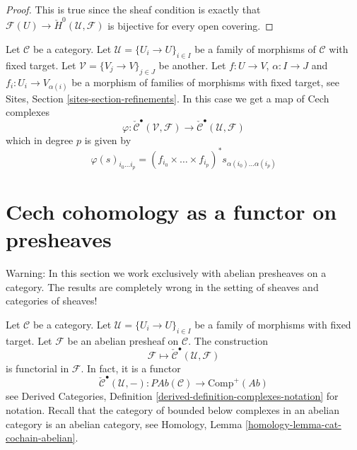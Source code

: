 \begin{proof}
This is true since the sheaf condition is exactly that
$\mathcal{F}(U) \to \check{H}^0(\mathcal{U}, \mathcal{F})$
is bijective for every open covering.
\end{proof}

\noindent
Let $\mathcal{C}$ be a category.
Let $\mathcal{U} = \{U_i \to U\}_{i\in I}$ be a family
of morphisms of $\mathcal{C}$ with fixed target.
Let $\mathcal{V} = \{V_j \to V\}_{j\in J}$ be another.
Let $f : U \to V$, $\alpha : I \to J$ and $f_i : U_i \to V_{\alpha(i)}$
be a morphism of families of morphisms with fixed target, see
Sites, Section \ref{sites-section-refinements}.
In this case we get a map of Cech complexes
\begin{equation}
\label{equation-map-cech-complexes}
\varphi : \check{\mathcal{C}}^\bullet(\mathcal{V}, \mathcal{F})
\longrightarrow
\check{\mathcal{C}}^\bullet(\mathcal{U}, \mathcal{F})
\end{equation}
which in degree $p$ is given by
$$
\varphi(s)_{i_0 \ldots i_p} =
(f_{i_0} \times \ldots \times f_{i_p})^*s_{\alpha(i_0) \ldots \alpha(i_p)}
$$


\section{Cech cohomology as a functor on presheaves}
\label{section-cech-functor}

\noindent
Warning: In this section we work exclusively with abelian presheaves
on a category. The results are completely wrong in the
setting of sheaves and categories of sheaves!

\medskip\noindent
Let $\mathcal{C}$ be a category.
Let $\mathcal{U} = \{U_i \to U\}_{i \in I}$ be a family of morphisms with
fixed target.
Let $\mathcal{F}$ be an abelian presheaf on $\mathcal{C}$.
The construction
$$
\mathcal{F} \longmapsto \check{\mathcal{C}}^\bullet(\mathcal{U}, \mathcal{F})
$$
is functorial in $\mathcal{F}$. In fact, it is a functor
\begin{equation}
\label{equation-cech-functor}
\check{\mathcal{C}}^\bullet(\mathcal{U}, -) :
\textit{PAb}(\mathcal{C})
\longrightarrow
\text{Comp}^{+}(\textit{Ab})
\end{equation}
see
Derived Categories, Definition \ref{derived-definition-complexes-notation}
for notation. Recall that the category of bounded below complexes
in an abelian category is an abelian category, see
Homology, Lemma \ref{homology-lemma-cat-cochain-abelian}.

